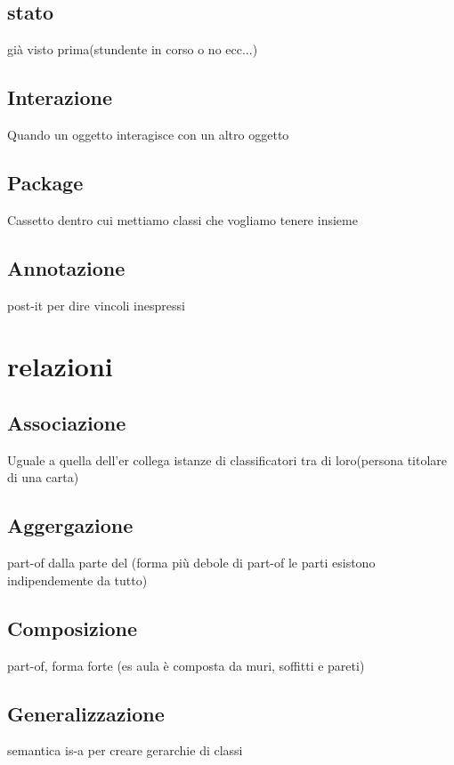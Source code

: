 \documentclass{report}
\begin{document}
            \subsection{stato}
                già visto prima(stundente in corso o no ecc...)
            \subsection{Interazione}
                Quando un oggetto interagisce con un altro oggetto
            \subsection{Package}
                Cassetto dentro cui mettiamo classi che vogliamo tenere insieme
            \subsection{Annotazione}
                post-it per dire vincoli inespressi
        \section{relazioni}
            \subsection{Associazione}
                Uguale a quella dell'er collega istanze di classificatori tra di loro(persona titolare di una carta)
            \subsection{Aggergazione}
                part-of dalla parte del (forma più debole di part-of le parti esistono indipendemente da tutto)
            \subsection{Composizione}
                part-of, forma forte (es aula è composta da muri, soffitti e pareti)
            \subsection{Generalizzazione}
                semantica is-a per creare gerarchie di classi
\end{document}
